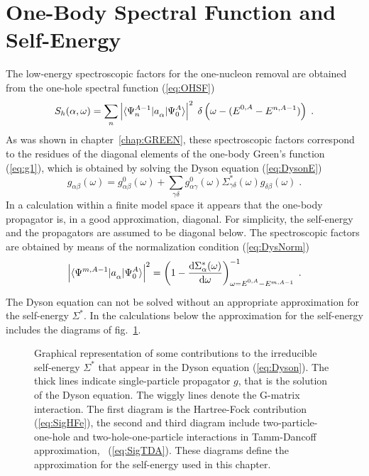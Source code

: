 \section{One-Body Spectral Function and Self-Energy}

The low-energy spectroscopic factors for the one-nucleon removal are obtained
from the one-hole spectral function (\ref{eq:OHSF})
%
\begin{equation}
		S_h(\alpha,\omega)
	=
		\sum_n
		\left|
			\ME< \Psi^{A-1}_n | \Oa{\alpha} | \Psi^A_0 >
		\right|^2
	\;
		\delta\left(\omega - (\EnulA - E^{n,A-1})\right)
	\;.
	\label{eqbis:OHSF}
	\end{equation}
%
As was shown in chapter~\ref{chap:GREEN}, these spectroscopic factors 
correspond to the
residues of the diagonal elements of the one-body Green's function 
(\ref{eq:g1}), which is obtained by solving the Dyson equation 
(\ref{eq:DysonE})
%
	\begin{equation}
		g_{\alpha\beta}(\omega)
	=
		g^0_{\alpha\beta}(\omega)
	+
		\sum_{\gamma\delta}
		g^0_{\alpha\gamma}(\omega)
		\Sigma^\ast_{\gamma\delta}(\omega)
		g^{\phantom{0}}_{\delta\beta}(\omega)
	\;.
	\label{eqbis:DysonE}
	\end{equation}
%
In a calculation within a finite model space it appears that the one-body
propagator is, in a good approximation, diagonal. 
For simplicity, the self-energy
and the propagators are assumed to be diagonal below.
The spectroscopic factors are obtained by means of  
the normalization condition (\ref{eq:DysNorm})
%
	\begin{equation}
		\left|
		\ME<\Psi^{m,A-1}| \Oa{\alpha} | \Psi^A_0 >
		\right|^2
	=
		\left(
			1
		-
			\frac{
				{\rm d} \Sigma_\alpha^\ast(\omega)
			}{
				{\rm d} \omega
			}
		\right)^{-1}_{\omega=\EnulA - E^{m,A-1}}
	\label{eq:sfNorm}
	\;.
	\end{equation}
%
The Dyson equation can not be solved without an appropriate approximation for
the self-energy $\Sigma^\ast$. In the calculations below the approximation 
for the self-energy includes the diagrams of fig.~\ref{fig:selfenergy}.
\begin{figure}
\centerline{
}
\caption[]{Graphical representation of some contributions to the irreducible 
self-energy $\Sigma^\ast$ that appear in the Dyson equation (\ref{eq:Dyson}).
The thick lines indicate single-particle propagator $g$, that is 
the solution of the Dyson equation. The wiggly lines denote the G-matrix
interaction. The first diagram is the 
Hartree-Fock contribution (\ref{eq:SigHFe}), the second and third diagram 
include two-particle-one-hole and two-hole-one-particle interactions in 
Tamm-Dancoff approximation, \cf\ (\ref{eq:SigTDA}). These diagrams define 
the approximation for the self-energy used in this chapter.
\label{fig:selfenergy}
}
\end{figure}
